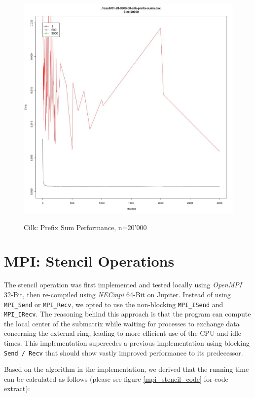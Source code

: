 \documentclass[12pt]{article}
\begin{document}
\begin{figure}[H]
\centering
\caption{Cilk: Prefix Sum Performance, n=20'000}

\includegraphics[scale=0.3]{candidate-graphs/cilk_by_threads_20000.jpg}
\label{cilk_20000}
\end{figure}


\newpage
\section{MPI: Stencil Operations}
The stencil operation was first implemented and tested locally using \emph{OpenMPI} 32-Bit, then re-compiled using \emph{NECmpi} 64-Bit on Jupiter. Instead of using \verb=MPI_Send= or \verb=MPI_Recv=, we opted to use the non-blocking \verb=MPI_ISend= and \verb=MPI_IRecv=. The reasoning behind this approach is that the program can compute the local center of the submatrix while waiting for processes to exchange data concerning the external ring, leading to more efficient use of the CPU and idle times.
This implementation supercedes a previous implementation using blocking \verb=Send / Recv= that should show vastly improved performance to its predecessor.

Based on the algorithm in the implementation, we derived that the running time can be calculated as follows (please see figure \ref{mpi_stencil_code} for code extract):
\end{document}
